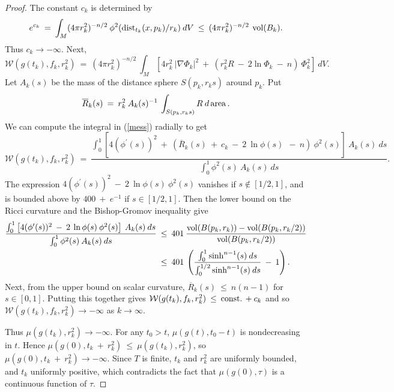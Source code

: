 \begin{proof}
The constant $c_k$ is determined by
\begin{equation}
e^{c_k} \: = \: \int_M (4 \pi r_k^2)^{-n/2} \:
\phi^2(\operatorname{dist}_{t_k}(x, p_k)/r_k) \: dV \: \le \:
(4 \pi r_k^2)^{-n/2} \:
\operatorname{vol}(B_k).
\end{equation}
Thus $c_k \rightarrow - \infty$.
Next,
\begin{equation} \label{mess}
{\mathcal W}(g(t_k), f_k, r_k^2) \: = \: (4 \pi r_k^2)^{-n/2} \:
\int_M \left[ 4 r_k^2 \: |\nabla \Phi_k|^2 \: + \:
( r_k^2 R \: - \: 2 \ln \Phi_k
\: - \: n ) \: \Phi_k^2 \right] \: dV.
\end{equation}
Let $A_k(s)$ be the mass of the distance sphere $S(p_k, r_k s)$ around $p_k$.
Put
\begin{equation}
\overline{R}_k(s) \: = \: r_k^{2} \: A_k(s)^{-1}
\: \int_{S(p_k, r_k s)} R \: d\operatorname{area}.
\end{equation}
We can compute the integral in (\ref{mess}) radially to get
\begin{equation}
{\mathcal W}(g(t_k), f_k, r_k^2) \:
= \:  \frac{\int_0^1 \left[ 4 (\phi^\prime(s))^2 \: + \:
(\overline{R}_k(s) \: + \: c_k \: - \: 2 \: \ln \phi(s) \:
\: - \: n ) \: \phi^2(s) \right] \: A_k(s) \:
ds}{\int_0^1 \phi^2(s) \: A_k(s) \: ds}.
\end{equation}
The expression
$4 (\phi^\prime(s))^2 \: - \: 2 \: \ln \phi(s) \: \phi^2(s)$ vanishes
if $s \notin [1/2, 1]$, and is bounded above by $400 \: + \: e^{-1}$ if
$s \in [1/2, 1]$. Then the lower
bound on the Ricci curvature and the Bishop-Gromov
inequality give
\begin{align}
\frac{\int_0^1 \left[ 4 (\phi^\prime(s))^2 \: - \: 2 \: \ln \phi(s)
\: \phi^2(s) \right] \: A_k(s) \:
ds}{\int_0^1 \phi^2(s) \: A_k(s) \: ds} \: & \le \: 401 \:
\frac{\operatorname{vol}(B(p_k, r_k)) - \operatorname{vol}(B(p_k, r_k/2))}{\operatorname{vol}(B(p_k, r_k/2))} \\
& \le \: 401 \: \left(
\frac{\int_0^1 \sinh^{n-1}(s)
\: ds}{\int_0^{1/2} \sinh^{n-1}(s) \: ds} \: - \: 1 \right).
\notag
\end{align}
Next, from the upper bound on scalar curvature,
$\overline{R}_k(s) \: \le \: n(n-1)$ for $s \in [0,1]$.
Putting this together gives
${\mathcal W}(g(t_k), f_k, r_k^2) \: \le \: \operatorname{const.} \: + \: c_k$ and
so ${\mathcal W}(g(t_k), f_k, r_k^2) \rightarrow -
\infty$ as $k \rightarrow \infty$.

Thus $\mu(g(t_k), r_k^2) \rightarrow - \infty$.
For any $t_0>t$, $\mu(g(t), t_0 - t)$ is
nondecreasing in $t$. Hence $\mu(g(0), t_k \: + \: r_k^2) \: \le \:
\mu(g(t_k), r_k^2)$, so $\mu(g(0), t_k \: + \: r_k^2) \rightarrow
- \infty$. Since $T$ is finite, $t_k$ and $r_k^2$ are
uniformly bounded,
and $t_k$ uniformly positive,
which
contradicts the fact that $\mu(g(0),\tau)$ is a continuous function of $\tau$.
\end{proof}

